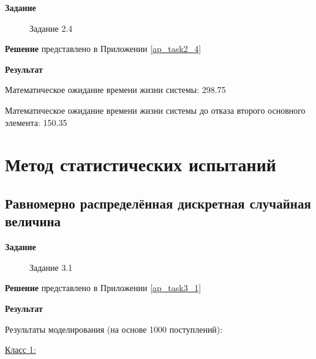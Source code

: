 \documentclass[otchet]{SCWorks}
\begin{document}
\textbf{Задание}

\begin{figure}[H]
	\caption{Задание 2.4}
	\label{pic6}
\end{figure}

\textbf{Решение} представлено в Приложении \ref{ap_task2_4}

\textbf{Результат} 

Математическое ожидание времени жизни системы: 298.75

Математическое ожидание времени жизни системы до отказа второго основного элемента: 150.35

\section{Метод статистических испытаний}
\subsection{Равномерно распределённая дискретная случайная величина}

\textbf{Задание}

\begin{figure}[H]
	\caption{Задание 3.1}
	\label{pic7}
\end{figure}

\textbf{Решение} представлено в Приложении \ref{ap_task3_1}

\textbf{Результат} 

Результаты моделирования (на основе 1000 поступлений):

\underline{Класс 1:} 
\end{document}
